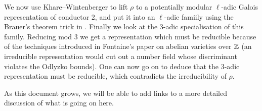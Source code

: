 We now use Khare--Wintenberger to lift $\rho$ to a potentially modular $\ell$-adic
Galois representation of conductor 2, and put it into an $\ell$-adic famiily using
the Brauer's theorem trick in \cite{blggt}. Finally we look at the 3-adic specialisation
of this family. Reducing mod 3 we get a representation which must be reducible because
of the techniques introduced in Fontaine's paper on abelian varieties over $\mathbb{Z}$ (an irreducible
representation would cut out a number field whose discriminant violates the Odlyzko bounds).
One can now go on to deduce that the 3-adic representation must be reducible, which
contradicts the irreducibility of $\rho$.

As this document grows, we will be able to add links to a more detailed discussion of
what is going on here.


